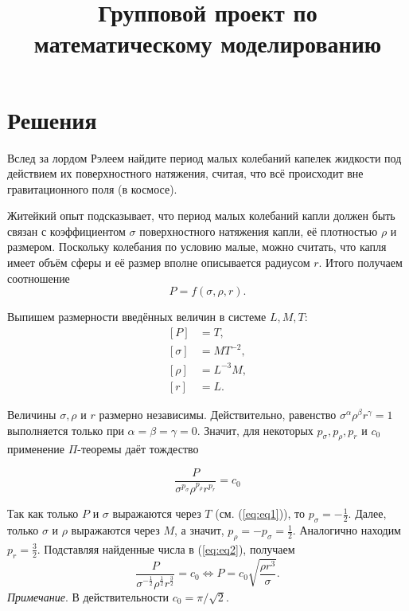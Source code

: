 


\title{Групповой проект по математическому моделированию}
\author{}
\date{}


\maketitle

\tableofcontents

\section{Решения}

 Вслед за лордом Рэлеем найдите период малых колебаний капелек жидкости под действием их поверхностного натяжения, считая, что всё происходит вне гравитационного поля (в космосе).\par

Житейкий опыт подсказывает, что период малых колебаний капли должен быть связан с коэффициентом $\sigma$ поверхностного натяжения капли, её плотностью $\rho$ и размером. Поскольку колебания по условию малые, можно считать, что капля имеет объём сферы и её размер вполне описывается радиусом $r$. Итого получаем соотношение
\[ P = f(\sigma, \rho, r). \]

Выпишем размерности введённых величин в системе $L, M, T$:
\begin{equation} \label{eq:eq1}
\begin{split}
[P] & = T,\\
[\sigma] & = MT^{-2},\\
[\rho] & = L^{-3}M,\\
[r] & = L.
\end{split}
\end{equation}

Величины $\sigma, \rho$ и $r$ размерно независимы. Действительно, равенство $\sigma ^\alpha \rho ^\beta r^\gamma =1$ выполняется только при $\alpha = \beta = \gamma = 0$. Значит, для некоторых $p_\sigma, p_\rho, p_r$ и $c_0$ применение $\Pi$-теоремы даёт тождество

\begin{equation} \label{eq:eq2}
\dfrac{P}{\sigma ^{p_\sigma} \rho ^{p_\rho} r^{p_r}} = c_0 
\end{equation}

Так как только $P$ и $\sigma$ выражаются через $T$ (см. (\ref{eq:eq1})), то $p_\sigma = -\frac{1}{2}$. Далее, только $\sigma$ и $\rho$ выражаются через 
$M$, а значит, $p_\rho = -p_\sigma = \frac{1}{2}$. Аналогично находим $p_r = \frac{3}{2}$. Подставляя найденные числа в (\ref{eq:eq2}), получаем
\[
\dfrac{P}{\sigma ^{-\frac{1}{2}} \rho ^{\frac{1}{2}} r^{\frac{3}{2}}} = c_0 \iff 
P = c_0 \sqrt{ \dfrac{\rho r^3}{\sigma} }.
\]
\emph{Примечание}. В действительности $c_0 = \pi / \sqrt{2}$.

